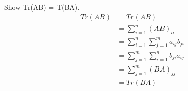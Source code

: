 \section{}

Show Tr(AB) = T(BA).
\begin{align*}
    Tr(AB) &= Tr(AB) \\
	    &= \sum_{i=1}^n (AB)_{ii} \\
	    &= \sum_{i=1}^n \sum_{j=1}^m a_{ij} b_{ji} \\
	    &= \sum_{j=1}^m \sum_{i=1}^n b_{ji} a_{ij} \\
	    &= \sum_{j=1}^m (BA)_{jj} \\
	    &= Tr(BA)
\end{align*}
